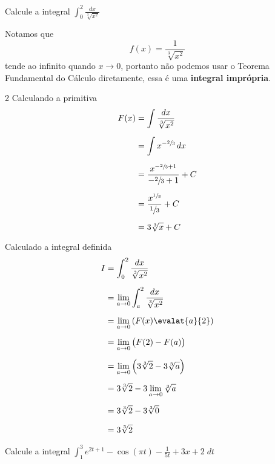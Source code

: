 \documentclass[a4paper,12pt,fleqn]{article}
\begin{document}

Calcule a integral
\(
  \int_0^2 \frac{dx}{\sqrt[3]{x^2}}
\)

\begin{answer}
  Notamos que
  \[
    f(x) = \frac{1}{\sqrt[3]{x^2}}
  \]
  tende ao infinito quando $x\to 0$, portanto não podemos usar o
  Teorema Fundamental do Cálculo diretamente, essa é uma
  \textbf{integral imprópria}.

  \begin{multicols}{2}
  Calculando a primitiva
  \begin{align*}
    F(x) & = \int \frac{dx}{\sqrt[3]{x^2}}                   \\[2mm]
         & = \int x^{-\sfrac{2}{3}} \,dx                     \\[2mm]
         & = \frac{x^{-\sfrac{2}{3}+1}}{-\sfrac{2}{3}+1} + C \\[2mm]
         & = \frac{x^{\sfrac{1}{3}}}{\sfrac{1}{3}} + C       \\[2mm]
         & = 3\sqrt[3]{x} + C
  \end{align*}

  \columnbreak

  Calculado a integral definida
  \begin{align*}
    I & = \int_0^2 \frac{dx}{\sqrt[3]{x^2}}                 \\[2mm]
      & = \lim_{a\to 0} \int_a^2 \frac{dx}{\sqrt[3]{x^2}}   \\[2mm]
      & = \lim_{a\to 0} \left(F(x)\evalat{a}{2}\right)      \\[2mm]
      & = \lim_{a\to 0} \big(F(2)-F(a)\big)                 \\[2mm]
      & = \lim_{a\to 0} \Big(3\sqrt[3]{2}-3\sqrt[3]{a}\Big) \\[2mm]
      & = 3\sqrt[3]{2} - 3\lim_{a\to 0} \sqrt[3]{a}         \\[2mm]
      & = 3\sqrt[3]{2} - 3\sqrt[3]{0}                       \\[2mm]
      & = 3\sqrt[3]{2}
  \end{align*}
\end{multicols}
\end{answer}

Calcule a integral
\(
  \int_1^3  e^{2t+1} - \cos(\pi t) - \frac{1}{5t} + 3x + 2 \;dt
\)
\end{document}
